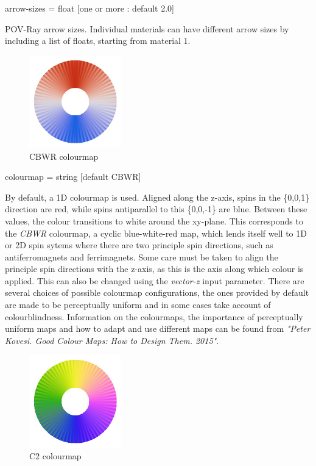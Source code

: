 {\zicf arrow-sizes = float [one or more : default 2.0]} POV-Ray arrow sizes. Individual materials can have different arrow sizes by including a list of floats, starting from material 1.

\begin{figure}[!h]
\center
\includegraphics[width=4cm]{figures/CBWR_colourmap.jpg}
\\ CBWR colourmap
\label{fig:CBWR_colourmap}
\end{figure}

{\zicf colourmap = string [default CBWR]} By default, a 1D colourmap is used. Aligned along the z-axis, spins in the \{0,0,1\} direction are red, while spins antiparallel to this \{0,0,-1\} are blue. Between these values, the colour transitions to white around the xy-plane. This corresponds to the \textit{CBWR} colourmap, a cyclic blue-white-red map, which lends itself well to 1D or 2D spin sytems where there are two principle spin directions, such as antiferromagnets and ferrimagnets. Some care must be taken to align the principle spin directions with the z-axis, as this is the axis along which colour is applied. This can also be changed using the \textit{vector-z} input parameter. There are several choices of possible colourmap configurations, the ones provided by default are made to be perceptually uniform and in some cases take account of colourblindness. Information on the colourmaps, the importance of perceptually uniform maps and how to adapt and use different maps can be found from \textit{"Peter Kovesi. Good Colour Maps: How to Design Them. 2015"}.

\begin{figure}[!h]
\center
\includegraphics[width=4cm]{figures/C2_colourmap.jpg}
\\ C2 colourmap
\label{fig:C2_colourmap}
\end{figure}

